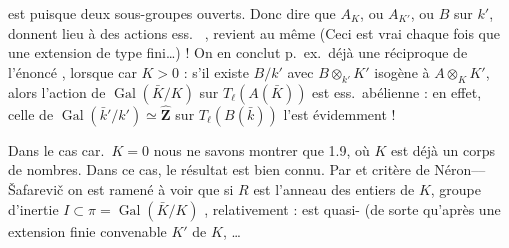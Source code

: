 \documentclass[11pt,a4paper]{article}
\begin{document}
est   puisque \ill{} \ill{} deux sous-groupes ouverts. Donc  \add{\ill{}} dire que \ill{} $A_K$, ou $A_{K'}$, ou $B$ sur $k'$, donnent lieu à des actions ess.\   , revient au même (Ceci est vrai chaque fois que \ill{} une extension de type fini\ldots{}) ! On en conclut p.\ ex.\ déjà une réciproque \struck{\ill{}} de l'énoncé , lorsque car $K > 0$ : s'il existe $B/k'$ avec $B \otimes_{k'} K'$ isogène à $A \otimes_K K'$, alors l'action de  $\operatorname{Gal}(\bar K/K)$  sur $T_\ell(A(\bar K))$ est \struck{\ill{}} ess.\ abélienne : en effet, celle de \struck{\ill{}} $\operatorname{Gal}(\bar k'/k') \simeq \hat{\mathbf{Z}}$ sur $T_\ell(B(\bar k))$ l'est évidemment !

Dans le cas car.\ $K = 0$ nous ne savons montrer que \ill{} \ill{} \ill{} 1.9, \ill{} \ill{} \ill{} \ill{} où \ill{} $K$ est déjà un corps de nombres. Dans ce cas,  le résultat est bien connu. Par \struck{\ill{}} \struck{\ill{} \ill{}} \ill{} \ill{} \ill{} \struck{\ill{}} \ill{} et \ill{} \ill{} critère de Néron----Šafarevič  on est ramené à voir que si $R$ est l'anneau des entiers de $K$,    groupe d'inertie $I \subset \pi = \operatorname{Gal}(\bar K/K)$ \ill{}, \ill{} relativement : \ill{} est quasi-  (de sorte qu'après une extension finie convenable $K'$ de $K$, \ldots

\end{document}
